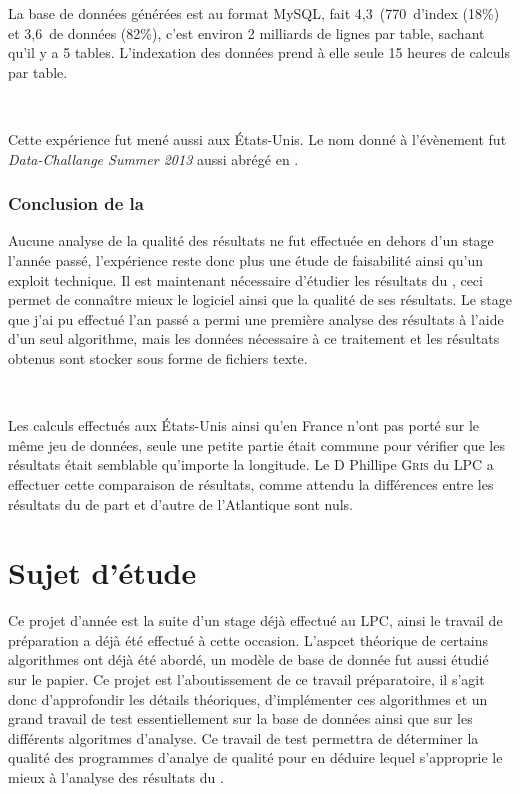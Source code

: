 La base de données générées est au format MySQL, fait 4,3\,\To{} (770\,\Go{} d'index (18\%) et 3,6\,\To{} de données (82\%), c'est environ 2 milliards de lignes par table, sachant qu'il y a 5 tables. L'indexation des données prend à elle seule 15 heures de calculs par table.

\ 

Cette expérience fut mené aussi aux États-Unis. Le nom donné à l'évènement fut \emph{Data-Challange Summer 2013} aussi abrégé en \DC{}.


		\subsubsection{Conclusion de la  \DC{}}

Aucune analyse de la qualité des résultats ne fut effectuée en dehors d'un stage l'année passé, l'expérience reste donc plus une étude de faisabilité ainsi qu'un exploit technique. Il est maintenant nécessaire d'étudier les résultats du \stack{}, ceci permet de connaître mieux le logiciel ainsi que la qualité de ses résultats. Le stage que j'ai pu effectué l'an passé a permi une première analyse des résultats à l'aide d'un seul algorithme, mais les données nécessaire à ce traitement et les résultats obtenus sont stocker sous forme de fichiers texte.

\ 

Les calculs effectués aux États-Unis ainsi qu'en France n'ont pas porté sur le même jeu de données, seule une petite partie était commune pour vérifier que les résultats était semblable qu'importe la longitude. Le D Phillipe \textsc{Gris} du LPC a effectuer cette comparaison de résultats, comme attendu la différences entre les résultats du \stack{} de part et d'autre de l'Atlantique sont nuls.


\section{Sujet d'étude}

Ce projet d'année est la suite d'un stage déjà effectué au LPC, ainsi le travail de préparation a déjà été effectué à cette occasion. L'aspcet théorique de certains algorithmes ont déjà été abordé, un modèle de base de donnée fut aussi étudié sur le papier. Ce projet est l'aboutissement de ce travail préparatoire, il s'agit donc d'approfondir les détails théoriques, d'implémenter ces algorithmes et un grand travail de test essentiellement sur la base de données ainsi que sur les différents algoritmes d'analyse. Ce travail de test permettra de déterminer la qualité des programmes d'analye de qualité pour en déduire lequel s'approprie le mieux à l'analyse des résultats du \stack.


